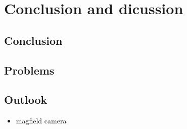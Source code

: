 \hypertarget{conclusion-and-dicussion}{%
\chapter{Conclusion and dicussion}\label{conclusion-and-dicussion}}

\hypertarget{conclusion}{%
\section{Conclusion}\label{conclusion}}

\hypertarget{problems}{%
\section{Problems}\label{problems}}

\hypertarget{outlook}{%
\section{Outlook}\label{outlook}}

\begin{itemize}
\tightlist
\item
  magfield camera
\end{itemize}

